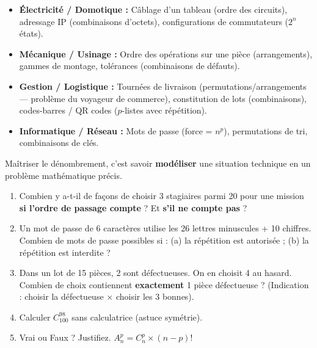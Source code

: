 \documentclass[11pt]{article}
\begin{document}
\begin{savaistu}
\begin{itemize}
    \item \textbf{Électricité / Domotique :} Câblage d'un tableau (ordre des circuits), adressage IP (combinaisons d'octets), configurations de commutateurs ($2^n$ états).
    \item \textbf{Mécanique / Usinage :} Ordre des opérations sur une pièce (arrangements), gammes de montage, tolérances (combinaisons de défauts).
    \item \textbf{Gestion / Logistique :} Tournées de livraison (permutations/arrangements — problème du voyageur de commerce), constitution de lots (combinaisons), codes-barres / QR codes ($p$-listes avec répétition).
    \item \textbf{Informatique / Réseau :} Mots de passe (force = $n^p$), permutations de tri, combinaisons de clés.
\end{itemize}
Maîtriser le dénombrement, c'est savoir \textbf{modéliser} une situation technique en un problème mathématique précis.
\end{savaistu}

\begin{exercice}
\begin{enumerate}
    \item Combien y a-t-il de façons de choisir 3 stagiaires parmi 20 pour une mission \textbf{si l'ordre de passage compte} ? Et \textbf{s'il ne compte pas} ?
    \item Un mot de passe de 6 caractères utilise les 26 lettres minuscules + 10 chiffres. Combien de mots de passe possibles si : (a) la répétition est autorisée ; (b) la répétition est interdite ?
    \item Dans un lot de 15 pièces, 2 sont défectueuses. On en choisit 4 au hasard. Combien de choix contiennent \textbf{exactement} 1 pièce défectueuse ? (Indication : choisir la défectueuse $\times$ choisir les 3 bonnes).
    \item Calculer $C_{100}^{98}$ sans calculatrice (astuce symétrie).
    \item Vrai ou Faux ? Justifiez. $A_n^p = C_n^p \times (n-p)!$
\end{enumerate}
\end{exercice}
\end{document}
